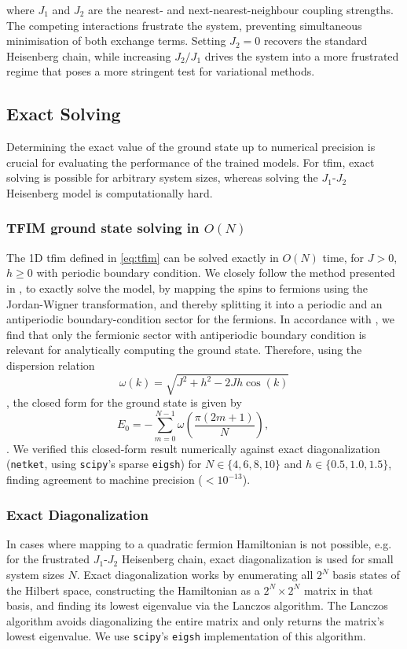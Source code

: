 \documentclass[10pt,a4paper]{article}
\numberwithin{equation}{section}
\begin{document}
where $J_1$ and $J_2$ are the nearest- and next-nearest-neighbour coupling strengths. The competing interactions frustrate the system, preventing simultaneous minimisation of both exchange terms. Setting $J_2 = 0$ recovers the standard Heisenberg chain, while increasing $J_2/J_1$ drives the system into a more frustrated regime that poses a more stringent test for variational methods.
\subsection{Exact Solving}
Determining the exact value of the ground state up to numerical precision is crucial for evaluating the performance of the trained models. For \gls{tfim}, exact solving is possible for arbitrary system sizes, whereas solving the $J_1$-$J_2$ Heisenberg model is computationally hard.
\subsubsection{TFIM ground state solving in \texorpdfstring{$O(N)$}{O(N)}}
The 1D \gls{tfim} defined in \autoref{eq:tfim} can be solved exactly in $O(N)$ time, for $J>0$, $h\geq0$ with periodic boundary condition. We closely follow the method presented in \cite{Lieb1961}\cite{He_2017}, to exactly solve the model, by mapping the spins to fermions using the Jordan-Wigner transformation, and thereby splitting it into a periodic and an antiperiodic boundary-condition sector for the fermions. In accordance with \cite{He_2017}, we find that only the fermionic sector with antiperiodic boundary condition is relevant for analytically computing the ground state. Therefore, using the dispersion relation
\begin{equation}
\omega(k) = \sqrt{J^2+h^2-2Jh\cos(k)}
\end{equation},
the closed form for the ground state is given by
\begin{equation}
E_0 = -\sum_{m=0}^{N-1} \omega\!\left(\frac{\pi(2m+1)}{N}\right),
\qquad
\end{equation}.
We verified this closed-form result numerically against exact diagonalization (\texttt{netket}, using \texttt{scipy}'s sparse \texttt{eigsh}) for $N \in \{4,6,8,10\}$ and $h \in \{0.5, 1.0, 1.5\}$, finding agreement to machine precision ($<10^{-13}$).
\subsubsection{Exact Diagonalization}
In cases where mapping to a quadratic fermion Hamiltonian is not possible, e.g. for the frustrated $J_1$-$J_2$ Heisenberg chain, exact diagonalization is used for small system sizes $N$.
Exact diagonalization works by enumerating all $2^N$ basis states of the Hilbert space, constructing the Hamiltonian as a $2^N \times 2^N$ matrix in that basis, and finding its lowest eigenvalue via the Lanczos algorithm. The Lanczos algorithm avoids diagonalizing the entire matrix and only returns the matrix's lowest eigenvalue. We use \texttt{scipy}'s \texttt{eigsh} implementation of this algorithm.
\end{document}
